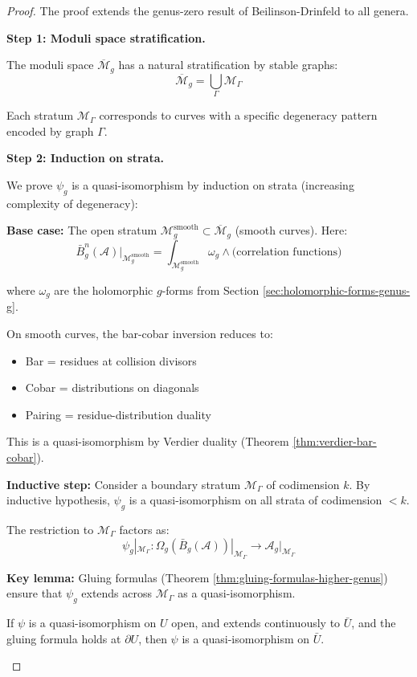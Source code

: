 \begin{proof}
The proof extends the genus-zero result of Beilinson-Drinfeld to all genera.

\textbf{Step 1: Moduli space stratification.}

The moduli space $\overline{\mathcal{M}}_g$ has a natural stratification by stable 
graphs:
$$\overline{\mathcal{M}}_g = \bigcup_{\Gamma} \mathcal{M}_\Gamma$$

Each stratum $\mathcal{M}_\Gamma$ corresponds to curves with a specific degeneracy 
pattern encoded by graph $\Gamma$.

\textbf{Step 2: Induction on strata.}

We prove $\psi_g$ is a quasi-isomorphism by induction on strata (increasing 
complexity of degeneracy):

\textbf{Base case:} The open stratum $\mathcal{M}_g^{\text{smooth}} \subset \overline{\mathcal{M}}_g$ 
(smooth curves). Here:
$$\bar{B}_g^n(\mathcal{A})|_{\mathcal{M}_g^{\text{smooth}}} = 
\int_{\mathcal{M}_g^{\text{smooth}}} \omega_g \wedge \text{(correlation functions)}$$

where $\omega_g$ are the holomorphic $g$-forms from Section \ref{sec:holomorphic-forms-genus-g}.

On smooth curves, the bar-cobar inversion reduces to:
\begin{itemize}
\item Bar = residues at collision divisors
\item Cobar = distributions on diagonals
\item Pairing = residue-distribution duality
\end{itemize}

This is a quasi-isomorphism by Verdier duality (Theorem \ref{thm:verdier-bar-cobar}).

\textbf{Inductive step:} Consider a boundary stratum $\mathcal{M}_\Gamma$ of 
codimension $k$. By inductive hypothesis, $\psi_g$ is a quasi-isomorphism on all 
strata of codimension $< k$.

The restriction to $\mathcal{M}_\Gamma$ factors as:
$$\psi_g|_{\mathcal{M}_\Gamma}: \Omega_g(\bar{B}_g(\mathcal{A}))|_{\mathcal{M}_\Gamma} 
\to \mathcal{A}_g|_{\mathcal{M}_\Gamma}$$

\textbf{Key lemma:} Gluing formulas (Theorem \ref{thm:gluing-formulas-higher-genus}) 
ensure that $\psi_g$ extends across $\mathcal{M}_\Gamma$ as a quasi-isomorphism.

\begin{lemma}\label{lem:extension-across-boundary-qi}
If $\psi$ is a quasi-isomorphism on $U$ open, and extends continuously to $\bar{U}$, 
and the gluing formula holds at $\partial U$, then $\psi$ is a quasi-isomorphism 
on $\bar{U}$.
\end{lemma}


\end{proof}
